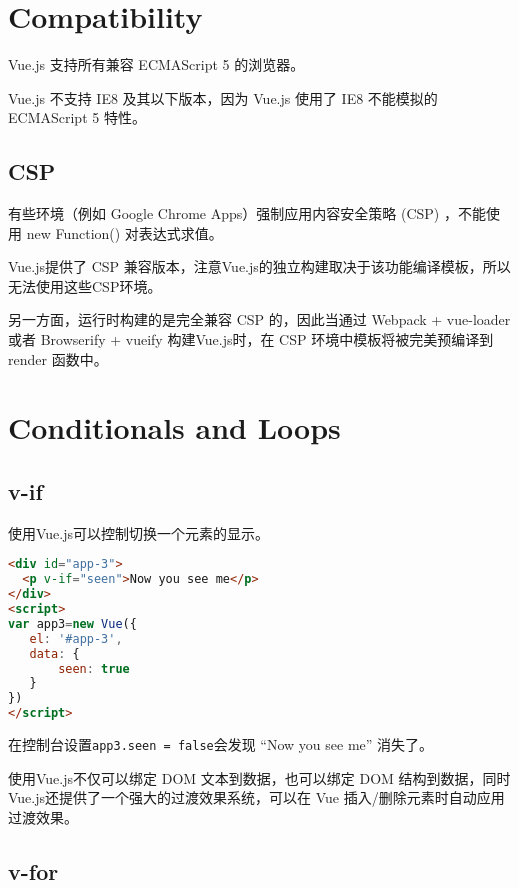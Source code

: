 \section{Compatibility}


 Vue.js 支持所有兼容 ECMAScript 5 的浏览器。
 
 Vue.js 不支持 IE8 及其以下版本，因为 Vue.js 使用了 IE8 不能模拟的 ECMAScript 5 特性。
 
 \subsection{CSP}
 
 
 有些环境（例如 Google Chrome Apps）强制应用内容安全策略 (CSP) ，不能使用 new Function() 对表达式求值。
 
Vue.js提供了 CSP 兼容版本，注意Vue.js的独立构建取决于该功能编译模板，所以无法使用这些CSP环境。

另一方面，运行时构建的是完全兼容 CSP 的，因此当通过 Webpack + vue-loader 或者 Browserify + vueify 构建Vue.js时，在 CSP 环境中模板将被完美预编译到 render 函数中。


 


\section{Conditionals and Loops}

\subsection{v-if}



使用Vue.js可以控制切换一个元素的显示。


\begin{lstlisting}[language=HTML]
<div id="app-3">
  <p v-if="seen">Now you see me</p>
</div>
<script>
var app3=new Vue({
   el: '#app-3',
   data: {
       seen: true
   }
})
</script>
\end{lstlisting}

在控制台设置\texttt{app3.seen = false}会发现 “Now you see me” 消失了。


使用Vue.js不仅可以绑定 DOM 文本到数据，也可以绑定 DOM 结构到数据，同时Vue.js还提供了一个强大的过渡效果系统，可以在 Vue 插入/删除元素时自动应用过渡效果。

\subsection{v-for}

